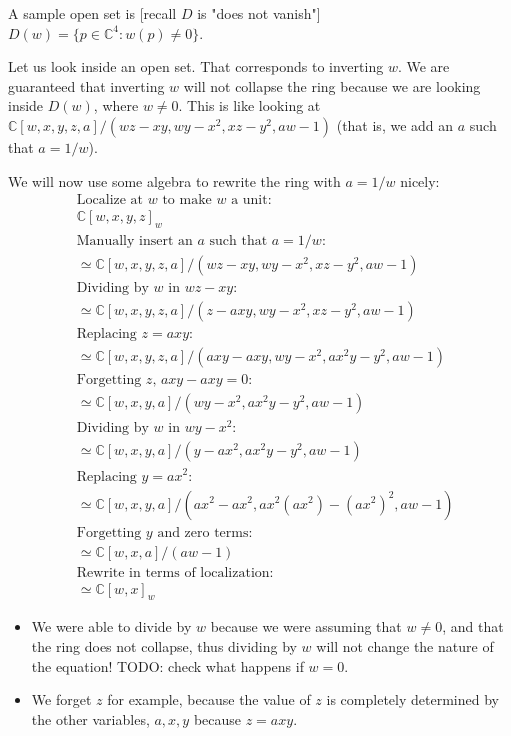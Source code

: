 \documentclass{book}
\newcommand{\C}{\ensuremath{\mathbb{C}}}
\theoremstyle{definition}
\begin{document}
A sample open set is [recall $D$ is "does not vanish"]
$D(w) = \{ p \in \C^4: w(p) \neq 0 \}$.

Let us look inside an open set. That corresponds to inverting $w$. We are 
guaranteed that inverting $w$ will not collapse the ring because we are
looking inside $D(w)$, where $w \neq 0$. This is like looking at
$\C[w, x, y, z, a]/(wz - xy, wy - x^2, xz - y^2, aw - 1)$ (that is, we
add an $a$ such that $a = 1/w$).

We will now use some algebra to rewrite the ring with $a = 1/w$ nicely:
\begin{align*}
&\text{Localize at $w$ to make $w$ a unit:} \\
&\C[w, x, y, z]_w \\
&\text{Manually insert an $a$ such that $a = 1/w$:} \\
&\simeq \C[w, x, y, z, a]/(wz - xy, wy - x^2, xz - y^2, aw - 1) \\
&\text{Dividing by $w$ in $wz - xy$:} \\
&\simeq \C[w, x, y, z, a]/(z - axy, wy-x^2, xz - y^2, aw -1)  \\
&\text{Replacing $z = axy$:} \\
&\simeq \C[w, x, y, z, a]/(axy - axy, wy-x^2, ax^2 y - y^2, aw -1)  \\
&\text{Forgetting $z$, $axy - axy = 0$:} \\
&\simeq \C[w, x, y, a]/(wy-x^2, ax^2 y - y^2, aw -1)  \\
&\text{Dividing by $w$ in $wy - x^2$:} \\
&\simeq \C[w, x, y, a]/(y-ax^2, ax^2 y - y^2, aw -1)  \\
&\text{Replacing $y = ax^2$:} \\
&\simeq \C[w, x, y, a]/(ax^2-ax^2, ax^2 (ax^2) - (ax^2)^2, aw -1)  \\
&\text{Forgetting $y$ and zero terms:} \\
&\simeq \C[w, x, a]/(aw -1)  \\
&\text{Rewrite in terms of localization:} \\
&\simeq \C[w, x]_w
\end{align*} 


\begin{itemize}
\item We were able to divide by $w$ because we were assuming that $w \neq 0$,
      and that the ring does not collapse, thus dividing by $w$ will not
      change the nature of the equation! TODO: check what happens if
      $w = 0$.
\item We forget $z$ for example, because the value of $z$ is completely 
      determined by the other variables, $a, x, y$ because $z = axy$.
\end{itemize}
\end{document}
